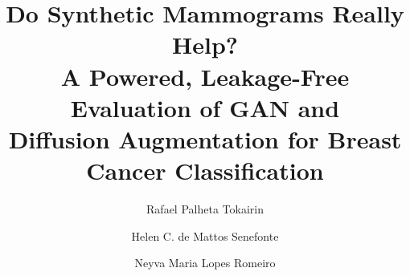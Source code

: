 \documentclass[runningheads]{llncs}
\begin{document}
\title{Do Synthetic Mammograms Really Help?\\
A Powered, Leakage-Free Evaluation of GAN and\\
Diffusion Augmentation for Breast Cancer Classification}

\author{Rafael Palheta Tokairin \and
Helen C. de Mattos Senefonte \and
Neyva Maria Lopes Romeiro}

\maketitle
\end{document}
